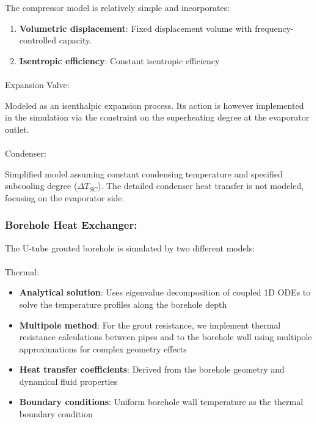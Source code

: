 \documentclass[journal=iecr,manuscript=]{achemso}
\makeatletter
\let\oldparagraph\paragraph
\renewcommand{\paragraph}{
    \@ifstar
      \xxxParagraphStar
      \xxxParagraphNoStar
  }
\newcommand{\xxxParagraphStar}[1]{\oldparagraph*{#1}\mbox{}}
\newcommand{\xxxParagraphNoStar}[1]{\oldparagraph{#1}\mbox{}}
\makeatother
\begin{document}
The compressor model is relatively simple and incorporates:

\begin{enumerate}
\def\labelenumi{\arabic{enumi}.}
\item
  \textbf{Volumetric displacement}: Fixed displacement volume with
  frequency-controlled capacity.
\item
  \textbf{Isentropic efficiency}: Constant isentropic efficiency
\end{enumerate}

\paragraph{Expansion Valve:}\label{expansion-valve}

Modeled as an isenthalpic expansion process. Its action is however
implemented in the simulation via the constraint on the superheating
degree at the evaporator outlet.

\paragraph{Condenser:}\label{condenser}

Simplified model assuming constant condensing temperature and specified
subcooling degree (\(\Delta T_{SC}\)). The detailed condenser heat
transfer is not modeled, focusing on the evaporator side.

\subsubsection{Borehole Heat Exchanger:}\label{borehole-heat-exchanger}

The U-tube grouted borehole is simulated by two different models:

\paragraph{Thermal:}\label{sec-method_thermal}

\begin{itemize}
\item
  \textbf{Analytical solution}: Uses eigenvalue decomposition of coupled
  1D ODEs to solve the temperature profiles along the borehole depth
\item
  \textbf{Multipole method}: For the grout resistance, we implement
  thermal resistance calculations between pipes and to the borehole wall
  using multipole approximations for complex geometry effects
\item
  \textbf{Heat transfer coefficients}: Derived from the borehole
  geometry and dynamical fluid properties
\item
  \textbf{Boundary conditions}: Uniform borehole wall temperature as the
  thermal boundary condition
\end{itemize}
\end{document}
